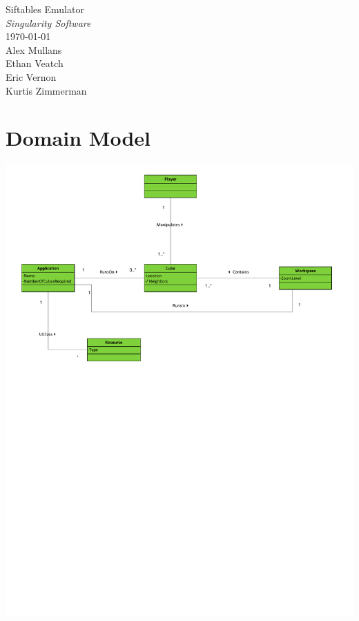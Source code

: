 \documentclass[12pt]{article}
\begin{document}
\vspace*{\fill}
        \begin{center}
                \LARGE{Siftables Emulator} \\
                \LARGE{\textit{Singularity Software}} \\
                \vspace{.15in}
                \large{\today} \\
                \vspace{4in}
                        Alex Mullans \\
                        Ethan Veatch \\
                        Eric Vernon \\
                        Kurtis Zimmerman
        \end{center}
\vspace*{\fill}
\thispagestyle{empty}

\section{Domain Model}
\includegraphics[scale=.8]{pdfs/DomainModel.pdf}
\end{document}
